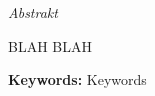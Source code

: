 \vfill
\begin{center}
{\it \large Abstrakt}
\vspace{0.2cm}

\begin{minipage}{0.8\textwidth}{
BLAH BLAH
\vspace{3mm}
\par \textbf{Keywords:} Keywords
}
\end{minipage}
\end{center}
\vfill
\vspace{1cm}
\newpage{}
